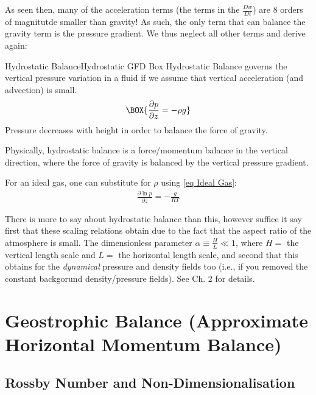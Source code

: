 As seen then, many of the acceleration terms (the terms in the \(\frac{Dw}{Dt}\)) are 8 orders of magnitutde smaller than gravity! As such, the only term that can balance the gravity term is the pressure gradient. We thus neglect all other terms and derive again:

\begin{fact}{Hydrostatic Balance}{Hydrostatic GFD Box}\label{Hydrostatic GFD Box}
Hydrostatic Balance governs the vertical pressure variation in a fluid if we assume that vertical acceleration (and advection) is small.
    \begin{equation}\label{Hydrostatic GFD}
    \BOX{
        \frac{\partial p}{\partial z}=-\rho g
    }
    \end{equation}
Pressure decreases with height in order to balance the force of gravity.
\end{fact}

Physically, hydrostatic balance is a force/momentum balance in the vertical direction, where the force of gravity is balanced by the vertical pressure gradient.

For an ideal gas, one can substitute for \(\rho\) using \ref{eq Ideal Gas}:
\begin{align}\label{Hydrostatic Ideal Gas}
    \boxed{\frac{\partial \ln p}{\partial z}=-\frac{g}{RT}}
\end{align}

There is more to say about hydrostatic balance than this, however suffice it say first that these scaling relations obtain due to the fact that the aspect ratio of the atmosphere is small. The dimensionless parameter \(\alpha \equiv \frac{H}{L}\ll 1\), where \(H=\) the vertical length scale and \(L=\) the horizontal length scale, and second that this obtains for the \textit{dynamical} pressure and density fields too (i.e., if you removed the constant backgorund density/pressure fields). See \cite{Vallis} Ch. 2 for details.

\section{Geostrophic Balance (Approximate Horizontal Momentum Balance)}\label{App Horiz Bal}

\subsection{Rossby Number and Non-Dimensionalisation}

